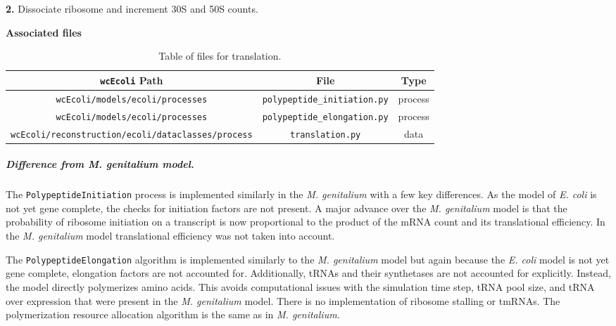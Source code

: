 \documentclass[12pt]{article}
\begin{document}
\begin{algorithm}[H]
{{            \textbf{2.} Dissociate ribosome and increment 30S and 50S counts.
        
        }
    }
    
\end{algorithm}    


\newpage
\textbf{Associated files}

\begin{table}[h!]
 \centering
 \scriptsize
 \begin{tabular}{c c c} 
 \hline
 \texttt{wcEcoli} Path & File & Type \\
 \hline
\texttt{wcEcoli/models/ecoli/processes} & \texttt{polypeptide\_initiation.py} & process \\
\texttt{wcEcoli/models/ecoli/processes} & \texttt{polypeptide\_elongation.py} & process \\
\texttt{wcEcoli/reconstruction/ecoli/dataclasses/process} & \texttt{translation.py} & data \\
 \hline
\end{tabular}
\caption[Table of files for translation]{Table of files for translation.}
\end{table}


\subparagraph{Difference from \emph{M. genitalium} model.}   
The \texttt{PolypeptideInitiation} process is implemented similarly in the \emph{M. genitalium} with a few key differences. As the model of \emph{E. coli} is not yet gene complete, the checks for initiation factors are not present. A major advance over the \emph{M. genitalium} model is that the probability of ribosome initiation on a transcript is now proportional to the product of the mRNA count and its translational efficiency. In the \emph{M. genitalium} model translational efficiency was not taken into account.

The \texttt{PolypeptideElongation} algorithm is implemented similarly to the \emph{M. genitalium} model but again because the \emph{E. coli} model is not yet gene complete, elongation factors are not accounted for. Additionally, tRNAs and their synthetases are not accounted for explicitly. Instead, the model directly polymerizes amino acids. This avoids computational issues with the simulation time step, tRNA pool size, and tRNA over expression that were present in the \emph{M. genitalium} model. There is no implementation of ribosome stalling or tmRNAs. The polymerization resource allocation algorithm is the same as in \emph{M. genitalium}.
\end{document}

